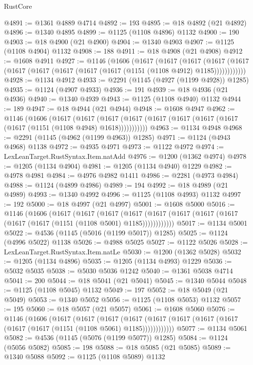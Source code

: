 \begin{lexlean}{RustCore}
\begin{coremodule}
@4891 := @1361 @4889 @4714
@4892 := 193
@4895 := @18 @4892 (@21 @4892)
@4896 := @1340 @4895
@4899 := @1125 (@1108 @4896) @1132
@4900 := 190
@4903 := @18 @4900 (@21 @4900)
@4904 := @1340 @4903
@4907 := @1125 (@1108 @4904) @1132
@4908 := 188
@4911 := @18 @4908 (@21 @4908)
@4912 := @1608 @4911
@4927 := @1146
    (@1606
      (@1617
        (@1617
          (@1617
            (@1617 (@1617 (@1617 (@1617 (@1617 (@1617 (@1617 (@1151 (@1108 @4912) @1185))))))))))))
@4928 := @1134 @4912
@4933 := @2291 (@1145 (@4927 (@1199 @4928)) @1285)
@4935 := @1124 (@4907 @4933)
@4936 := 191
@4939 := @18 @4936 (@21 @4936)
@4940 := @1340 @4939
@4943 := @1125 (@1108 @4940) @1132
@4944 := 189
@4947 := @18 @4944 (@21 @4944)
@4948 := @1608 @4947
@4962 := @1146
    (@1606
      (@1617
        (@1617
          (@1617 (@1617 (@1617 (@1617 (@1617 (@1617 (@1617 (@1151 (@1108 @4948) @1618)))))))))))
@4963 := @1134 @4948
@4968 := @2291 (@1145 (@4962 (@1199 @4963)) @1285)
@4971 := @1124 (@4943 @4968) @1138
@4972 := @4935 @4971
@4973 := @1122 @4972
@4974 := LexLeanTarget.RustSyntax.Item.natAdd
@4976 := @1200 (@1362 @4974)
@4978 := @1205 (@1134 @4904)
@4981 := @1205 (@1134 @4940) @1229
@4982 := @4978 @4981
@4984 := @4976 @4982 @1411
@4986 := @2281 (@4973 @4984)
@4988 := @1124 (@4899 @4986)
@4989 := 194
@4992 := @18 @4989 (@21 @4989)
@4993 := @1340 @4992
@4996 := @1125 (@1108 @4993) @1132
@4997 := 192
@5000 := @18 @4997 (@21 @4997)
@5001 := @1608 @5000
@5016 := @1146
    (@1606
      (@1617
        (@1617
          (@1617
            (@1617 (@1617 (@1617 (@1617 (@1617 (@1617 (@1617 (@1151 (@1108 @5001) @1185))))))))))))
@5017 := @1134 @5001
@5022 := @4536 (@1145 (@5016 (@1199 @5017)) @1285)
@5025 := @1124 (@4996 @5022) @1138
@5026 := @4988 @5025
@5027 := @1122 @5026
@5028 := LexLeanTarget.RustSyntax.Item.natLe
@5030 := @1200 (@1362 @5028)
@5032 := @1205 (@1134 @4896)
@5035 := @1205 (@1134 @4993) @1229
@5036 := @5032 @5035
@5038 := @5030 @5036 @1242
@5040 := @1361 @5038 @4714
@5041 := 200
@5044 := @18 @5041 (@21 @5041)
@5045 := @1340 @5044
@5048 := @1125 (@1108 @5045) @1132
@5049 := 197
@5052 := @18 @5049 (@21 @5049)
@5053 := @1340 @5052
@5056 := @1125 (@1108 @5053) @1132
@5057 := 195
@5060 := @18 @5057 (@21 @5057)
@5061 := @1608 @5060
@5076 := @1146
    (@1606
      (@1617
        (@1617
          (@1617
            (@1617 (@1617 (@1617 (@1617 (@1617 (@1617 (@1617 (@1151 (@1108 @5061) @1185))))))))))))
@5077 := @1134 @5061
@5082 := @4536 (@1145 (@5076 (@1199 @5077)) @1285)
@5084 := @1124 (@5056 @5082)
@5085 := 198
@5088 := @18 @5085 (@21 @5085)
@5089 := @1340 @5088
@5092 := @1125 (@1108 @5089) @1132

\end{coremodule}
\end{lexlean}
